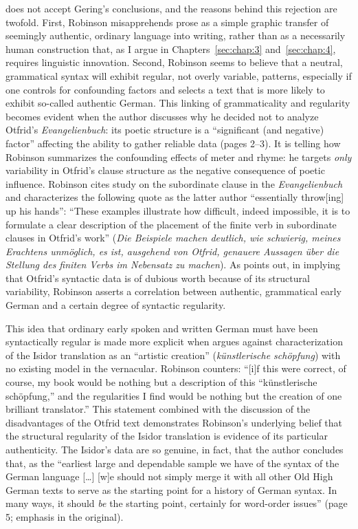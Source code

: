 \citet{Robinson1997} does not accept Gering’s conclusions, and the reasons behind this rejection are twofold. First, Robinson misapprehends prose as a simple graphic transfer of seemingly authentic, ordinary language into writing, rather than as a necessarily human construction that, as I argue in Chapters~\ref{sec:chap:3} and~\ref{sec:chap:4}, requires linguistic innovation. Second, Robinson seems to believe that a neutral, grammatical syntax will exhibit regular, not overly variable, patterns, especially if one controls for confounding factors and selects a text that is more likely to exhibit so-called authentic German. This linking of grammaticality and regularity becomes evident when the author discusses why he decided not to analyze Otfrid’s \textit{Evangelienbuch}: its poetic structure is a “significant (and negative) factor” affecting the ability to gather reliable data (pages 2--3). It is telling how Robinson summarizes the confounding effects of meter and rhyme: he targets \textit{only} variability in Otfrid’s clause structure as the negative consequence of poetic influence. Robinson cites  study on the subordinate clause in the \textit{Evangelienbuch} and characterizes the following quote as the latter author “essentially throw[ing] up his hands”: “These examples illustrate how difficult, indeed impossible, it is to formulate a clear description of the placement of the finite verb in subordinate clauses in Otfrid’s work” (\textit{Die Beispiele machen deutlich, wie schwierig, meines Erachtens unmöglich, es ist, ausgehend von Otfrid, genauere Aussagen über die Stellung des finiten Verbs im Nebensatz zu machen}). As \citet[370--373]{Somers2021a} points out, in implying that Otfrid’s syntactic data is of dubious worth because of its structural variability, Robinson asserts a correlation between authentic, grammatical early German and a certain degree of syntactic regularity.

This idea that ordinary early spoken and written German must have been syntactically regular is made more explicit when \citet[3]{Robinson1997} argues against  characterization of the Isidor translation as an “artistic creation” (\textit{künstlerische schöpfung}) with no existing model in the vernacular. Robinson counters: “[i]f this were correct, of course, my book would be nothing but a description of this “künstlerische schöpfung,” and the regularities I find would be nothing but the creation of one brilliant translator.” This statement combined with the discussion of the disadvantages of the Otfrid text demonstrates Robinson’s underlying belief that the structural regularity of the Isidor translation is evidence of its particular authenticity. The Isidor’s data are so genuine, in fact, that the author concludes that, as the “earliest large and dependable sample we have of the syntax of the German language […] [w]e should not simply merge it with all other Old High German texts to serve as the starting point for a history of German syntax. In many ways, it should \textit{be} the starting point, certainly for word-order issues” (page 5; emphasis in the original).

